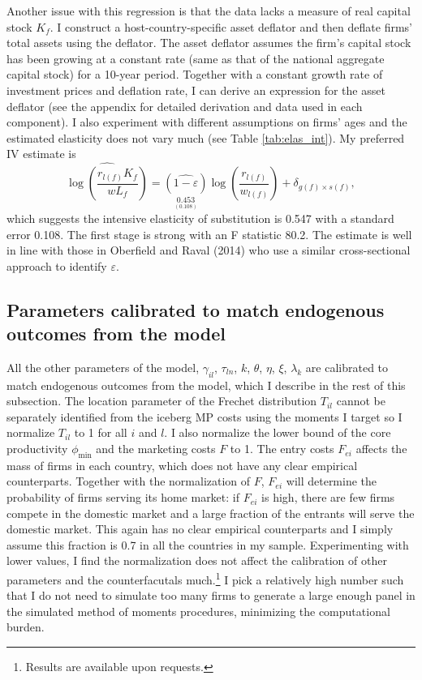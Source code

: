 \documentclass[notitlepage,11pt]{article}%
\begin{document}
Another issue with this regression is that the data lacks a measure of real
capital stock $K_{f}$. I construct a host-country-specific asset deflator and
then deflate firms' total assets using the deflator. The asset deflator
assumes the firm's capital stock has been growing at a constant rate (same as
that of the national aggregate capital stock) for a 10-year period. Together
with a constant growth rate of investment prices and deflation rate, I can
derive an expression for the asset deflator (see the appendix for detailed
derivation and data used in each component). I also experiment with different
assumptions on firms' ages and the estimated elasticity does not vary much
(see Table \ref{tab:elas_int}). My preferred IV estimate is%
\[
\widehat{\log\left(  \frac{r_{l\left(  f\right)  }K_{f}}{wL_{f}}\right)
}=\underset{\underset{\left(  0.108\right)  }{0.453}}{\left(
\widehat{1-\varepsilon}\right)  }\log\left(  \frac{r_{l\left(  f\right)  }%
}{w_{l\left(  f\right)  }}\right)  +\delta_{g\left(  f\right)  \times s\left(
f\right)  },
\]
which suggests the intensive elasticity of substitution is 0.547 with a
standard error 0.108. The first stage is strong with an F statistic 80.2. The
estimate is well in line with those in Oberfield and Raval (2014) who use a
similar cross-sectional approach to identify $\varepsilon$.

\subsection{Parameters calibrated to match endogenous outcomes from the model}

All the other parameters of the model, $\gamma_{il}$, $\tau_{ln}$, $k$,
$\theta$, $\eta$, $\xi$, $\lambda_{k}$ are calibrated to match endogenous
outcomes from the model, which I describe in the rest of this subsection. The
location parameter of the Frechet distribution $T_{il}$ cannot be separately
identified from the iceberg MP costs using the moments I target so I normalize
$T_{il}$ to 1 for all $i$ and $l$. I also normalize the lower bound of the
core productivity $\phi_{\min}$ and the marketing costs $F$ to 1. The entry
costs $F_{ei}$ affects the mass of firms in each country, which does not have
any clear empirical counterparts. Together with the normalization of $F$,
$F_{ei}$ will determine the probability of firms serving its home market: if
$F_{ei}$ is high, there are few firms compete in the domestic market and a
large fraction of the entrants will serve the domestic market. This again has
no clear empirical counterparts and I simply assume this fraction is 0.7 in
all the countries in my sample. Experimenting with lower values, I find the
normalization does not affect the calibration of other parameters and the
counterfacutals much.\footnote{Results are available upon requests.} I pick a
relatively high number such that I do not need to simulate too many firms to
generate a large enough panel in the simulated method of moments procedures,
minimizing the computational burden.
\end{document}
